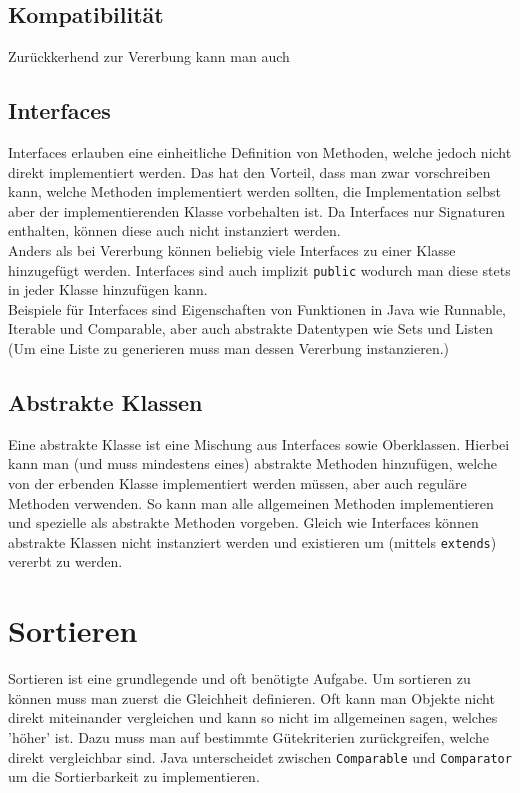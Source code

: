 \documentclass{article}
\begin{document}
	\subsection{Kompatibilität}
	Zurückkerhend zur Vererbung kann man auch
	\subsection{Interfaces}
	\label{sub:interfaces}
	Interfaces erlauben eine einheitliche Definition von Methoden, welche jedoch nicht direkt implementiert werden. Das hat den Vorteil, dass man zwar vorschreiben kann, welche Methoden implementiert werden sollten, die Implementation selbst aber der implementierenden Klasse vorbehalten ist. Da Interfaces nur Signaturen enthalten, können diese auch nicht instanziert werden.\\
	Anders als bei Vererbung können beliebig viele Interfaces zu einer Klasse hinzugefügt werden. Interfaces sind auch implizit \texttt{public} wodurch man diese stets in jeder Klasse hinzufügen kann. \\
	Beispiele für Interfaces sind Eigenschaften von Funktionen in Java wie Runnable, Iterable und Comparable, aber auch abstrakte Datentypen wie Sets und Listen (Um eine Liste zu generieren muss man dessen Vererbung instanzieren.)
	\subsection{Abstrakte Klassen}
	Eine abstrakte Klasse ist eine Mischung aus Interfaces sowie Oberklassen. Hierbei kann man (und muss mindestens eines) abstrakte Methoden hinzufügen, welche von der erbenden Klasse implementiert werden müssen, aber auch reguläre Methoden verwenden. So kann man alle allgemeinen Methoden implementieren und spezielle als abstrakte Methoden vorgeben. Gleich wie Interfaces können abstrakte Klassen nicht instanziert werden und existieren um (mittels \texttt{extends}) vererbt zu werden.
	\section{Sortieren}
	Sortieren ist eine grundlegende und oft benötigte Aufgabe. Um sortieren zu können muss man zuerst die Gleichheit definieren. Oft kann man Objekte nicht direkt miteinander vergleichen und kann so nicht im allgemeinen sagen, welches 'höher' ist. Dazu muss man auf bestimmte Gütekriterien zurückgreifen, welche direkt vergleichbar sind. Java unterscheidet zwischen \texttt{Comparable} und \texttt{Comparator} um die Sortierbarkeit zu implementieren. 
\end{document}
